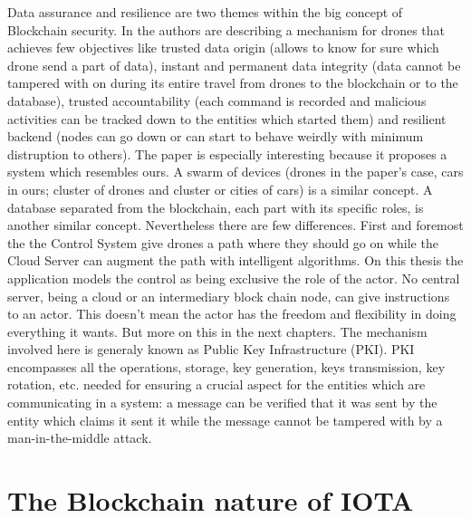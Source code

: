 \documentclass[a4paper,12pt,twoside]{book}
\begin{document}
    Data assurance and resilience are two themes within the big concept of Blockchain security. In \cite{TowardsdatAassuranceAndResilience} the authors are describing a mechanism for drones that achieves few objectives like trusted data origin (allows to know for sure which drone send a part of data), instant and permanent data integrity (data cannot be tampered with on during its entire travel from drones to the blockchain or to the database), trusted accountability (each command is recorded and malicious activities can be tracked down to the entities which started them) and resilient backend (nodes can go down or can start to behave weirdly with minimum distruption to others). The paper is especially interesting because it proposes a system which resembles ours. A swarm of devices (drones in the paper's case, cars in ours; cluster of drones and cluster or cities of cars) is a similar concept. A database separated from the blockchain, each part with its specific roles, is another similar concept. Nevertheless there are few differences. First and foremost the the Control System give drones a path where they should go on while the Cloud Server can augment the path with intelligent algorithms. On this thesis the application models the control as being exclusive the role of the actor. No central server, being a cloud or an intermediary block chain node, can give instructions to an actor. This doesn't mean the actor has the freedom and flexibility in doing everything it wants. But more on this in the next chapters. The mechanism involved here is generaly known as Public Key Infrastructure (PKI). PKI encompasses all the operations, storage, key generation, keys transmission, key rotation, etc. needed for ensuring a crucial aspect for the entities which are communicating in a system: a message can be verified that it was sent by the entity which claims it sent it while the message cannot be tampered with by a man-in-the-middle attack.

\section{The Blockchain nature of IOTA}
\label{sec:IOTABlockchainNature}
\end{document}
